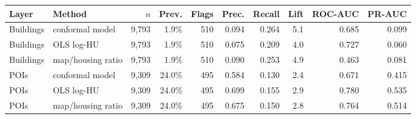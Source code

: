 \begin{tabular}{llrrrrrrrr}
\toprule
Layer & Method & $n$ & Prev. & Flags & Prec. & Recall & Lift & ROC-AUC & PR-AUC \\
\midrule
Buildings & conformal model & 9,793 & 1.9\% & 510 & 0.094 & 0.264 & 5.1 & 0.685 & 0.099 \\
Buildings & OLS log-HU & 9,793 & 1.9\% & 510 & 0.075 & 0.209 & 4.0 & 0.727 & 0.060 \\
Buildings & map/housing ratio & 9,793 & 1.9\% & 510 & 0.090 & 0.253 & 4.9 & 0.463 & 0.081 \\
POIs & conformal model & 9,309 & 24.0\% & 495 & 0.584 & 0.130 & 2.4 & 0.671 & 0.415 \\
POIs & OLS log-HU & 9,309 & 24.0\% & 495 & 0.699 & 0.155 & 2.9 & 0.780 & 0.535 \\
POIs & map/housing ratio & 9,309 & 24.0\% & 495 & 0.675 & 0.150 & 2.8 & 0.764 & 0.514 \\
\bottomrule
\end{tabular}